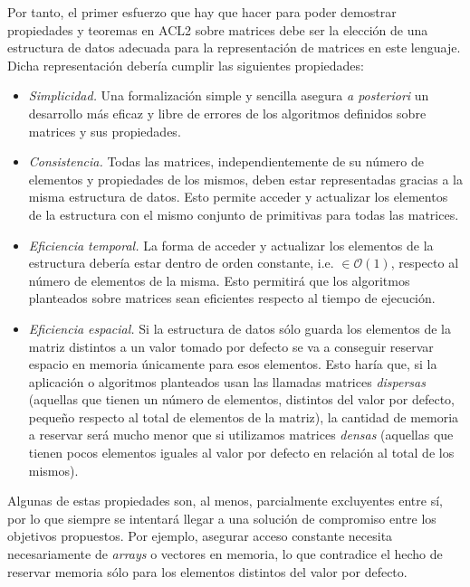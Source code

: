 \documentclass[a4paper,10pt]{article}
\begin{document}
Por tanto, el primer esfuerzo que hay que hacer para poder demostrar propiedades y teoremas en ACL2 sobre matrices debe ser la elección de una estructura de datos adecuada para la representación de matrices en este lenguaje. Dicha representación debería cumplir las siguientes propiedades:
\begin{itemize}
	\item \emph{Simplicidad.} Una formalización simple y sencilla asegura \emph{a posteriori} un desarrollo más eficaz y libre de errores de los algoritmos definidos sobre matrices y sus propiedades.
	\item \emph{Consistencia.} Todas las matrices, independientemente de su número de elementos y propiedades de los mismos, deben estar representadas gracias a la misma estructura de datos. Esto permite acceder y actualizar los elementos de la estructura con el mismo conjunto de primitivas para todas las matrices.
	\item \emph{Eficiencia temporal.} La forma de acceder y actualizar los elementos de la estructura debería estar dentro de orden constante, i.e. $\in \mathcal{O}(1)$, respecto al número de elementos de la misma. Esto permitirá que los algoritmos planteados sobre matrices sean eficientes respecto al tiempo de ejecución.
	\item \emph{Eficiencia espacial.} Si la estructura de datos sólo guarda los elementos de la matriz distintos a un valor tomado por defecto se va a conseguir reservar espacio en memoria únicamente para esos elementos. Esto haría que, si la aplicación o algoritmos planteados usan las llamadas matrices \emph{dispersas}
(aquellas que tienen un número de elementos, distintos del valor por defecto, pequeño respecto al total de elementos de la matriz), la cantidad de memoria a reservar será mucho menor que si utilizamos matrices \emph{densas} (aquellas que tienen pocos elementos iguales al valor por defecto en relación al total de los mismos). 
\end{itemize} 

\par \vspace{10pt}

Algunas de estas propiedades son, al menos, parcialmente excluyentes entre sí, por lo que siempre se intentará llegar a una solución de compromiso entre los objetivos propuestos. Por ejemplo, asegurar acceso constante necesita necesariamente de \emph{arrays} o vectores en memoria, lo que contradice el hecho de reservar memoria sólo para los elementos distintos del valor por defecto.
\end{document}
